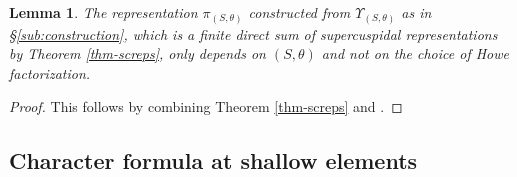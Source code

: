 \documentclass{article}
\newtheorem{lem}[thm]{Lemma}
\theoremstyle{definition}
\numberwithin{equation}{subsection}
\renewcommand{\-}{\hyp{}}
\begin{document}
\begin{lem}\label{lem:Sthetarep}
	The representation $\pi_{(S,\theta)}$ constructed from $\Upsilon_{(S,\theta)}$ as in \S\ref{sub:construction}, which is a finite direct sum of supercuspidal representations by Theorem \ref{thm-screps}, only depends on $(S,\theta)$ and not on the choice of Howe factorization. 
\end{lem}
\begin{proof}
	This follows by combining Theorem \ref{thm-screps} and \cite[Lemma~2.6.10]{KalSLP}.
\end{proof}

 


\subsection{Character formula at shallow elements} \label{sub:char}
\end{document}
